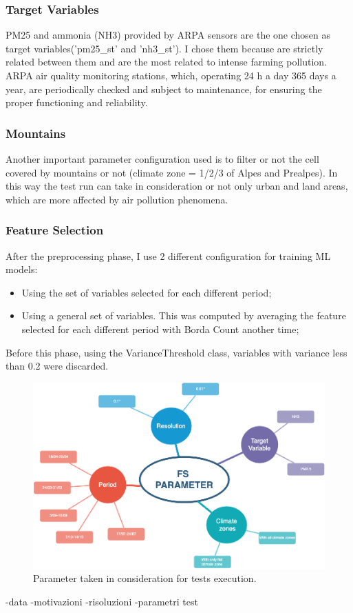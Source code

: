 \subsubsection{Target Variables}
PM25 and ammonia (NH3) provided by ARPA sensors are the one chosen as target variables('pm25\_st' and 'nh3\_st'). I chose them because are strictly related between them and are the most related to intense farming pollution.
ARPA air quality monitoring stations, which, operating 24 h a day 365 days a year, are periodically checked and subject to maintenance, for ensuring the proper functioning and reliability.


\subsubsection{Mountains}
Another important parameter configuration used is to filter or not the cell covered by mountains or not (climate zone = 1/2/3 of Alpes and Prealpes). In this way the test run can take in consideration or not only urban and land areas, which are more affected by air pollution phenomena.


\subsubsection{Feature Selection}
\label{subsub:fs}
After the preprocessing phase, I use 2 different configuration for training ML models:
\begin{itemize}
    \item Using the set of variables selected for each different period;
    \item Using a general set of variables. This was computed by averaging the feature selected for each different period with Borda Count another time;
\end{itemize}
Before this phase, using the VarianceThreshold class, variables with variance less than 0.2 were discarded. 

\begin{figure}
    \centering
    \includegraphics[width=.9\textwidth]{images/test_param.png}
    \caption{Parameter taken in consideration for tests execution.}
    \label{fig:test_params}
\end{figure}
-data
-motivazioni
-risoluzioni
-parametri test
